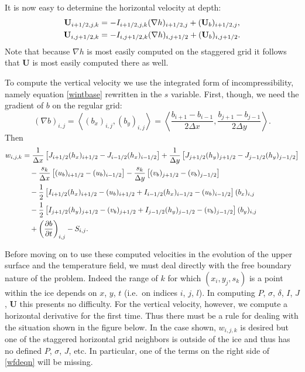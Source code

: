\documentclass[12pt,final]{amsart}%
\theoremstyle{plain}
\theoremstyle{definition}
\theoremstyle{remark}
\newcommand{\ddt}[1]{\ensuremath{\frac{\partial #1}{\partial t}}}
\newcommand{\grad}{\nabla}
\newcommand{\ip}[2]{\ensuremath{\left<#1,#2\right>}}
\newcommand{\bU}{{\mathbf{U}}}
\begin{document}
It is now easy to determine the horizontal velocity at depth:
\begin{align}
\bU_{i+1/2,j,k} &= - I_{i+1/2,j,k} (\grad h)_{i+1/2,j} + (\bU_b)_{i+1/2,j}, \\
\bU_{i,j+1/2,k} &= - I_{i,j+1/2,k} (\grad h)_{i,j+1/2} + (\bU_b)_{i,j+1/2}. \notag
\end{align}
Note that because $\grad h$ is most easily computed on the staggered grid it follows that $\bU$ is most easily computed there as well.

To compute the vertical velocity we use the integrated form of incompressibility, namely equation \eqref{wintbase} rewritten in the $s$ variable.  First, though, we need the gradient of $b$ on the regular grid:
\begin{equation}(\grad b)_{i,j} = \ip{(b_x)_{i,j}}{(b_y)_{i,j}} = \ip{\frac{b_{i+1}-b_{i-1}}{2\Delta x}}{\frac{b_{j+1}-b_{j-1}}{2\Delta y}}.\end{equation}
Then
\begin{align}
w_{i,j,k} &= \frac{1}{\Delta x}\left[J_{i+1/2}(h_x)_{i+1/2}-J_{i-1/2} (h_x)_{i-1/2}\right] + \frac{1}{\Delta y}\left[J_{j+1/2}(h_y)_{j+1/2}-J_{j-1/2} (h_y)_{j-1/2}\right] \notag\\
    &\quad - \frac{s_k}{\Delta x}\left[(u_b)_{i+1/2}- (u_b)_{i-1/2}\right] - \frac{s_k}{\Delta y}\left[(v_b)_{j+1/2}- (v_b)_{j-1/2}\right] \notag\\
    &\quad -\frac{1}{2}\left[I_{i+1/2}(h_x)_{i+1/2}-(u_b)_{i+1/2} + I_{i-1/2}(h_x)_{i-1/2}-(u_b)_{i-1/2}\right](b_x)_{i,j} \notag\\
    &\quad -\frac{1}{2}\left[I_{j+1/2}(h_y)_{j+1/2}-(v_b)_{j+1/2} + I_{j-1/2}(h_y)_{j-1/2}-(v_b)_{j-1/2}\right](b_y)_{i,j} \notag\\
\label{wfdeqn}    &\quad + \left(\ddt{b}\right)_{i,j} - S_{i,j}.\end{align}

Before moving on to use these computed velocities in the evolution of the upper surface and the temperature field, we must deal directly with the free boundary nature of the problem.  Indeed the range of $k$ for which $(x_i,y_j,s_k)$ is a point within the ice depends on $x$, $y$, $t$ (i.e.~on indices $i$, $j$, $l$).  In computing $P$, $\sigma$, $\delta$, $I$, $J$, $\bU$ this presents no difficulty.  For the vertical velocity, however, we compute a horizontal derivative for the first time.  Thus there must be a rule for dealing with the situation shown in the figure below.  In the case shown, $w_{i,j,k}$ is desired but one of the staggered horizontal grid neighbors is outside of the ice and thus has no defined $P$, $\sigma$, $J$, etc.  In particular, one of the terms on the right side of \eqref{wfdeqn} will be missing.
\end{document}

